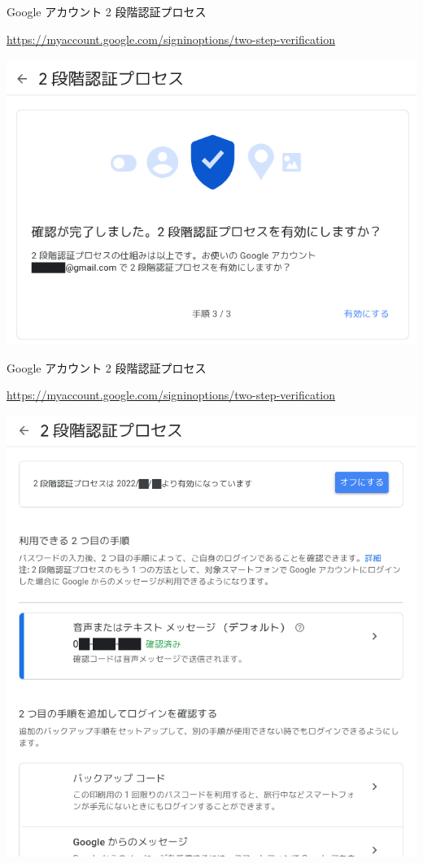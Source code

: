 \begin{frame}{Google アカウント 2 段階認証プロセス}

{\footnotesize\url{https://myaccount.google.com/signinoptions/two-step-verification}}

\begin{center}
\includegraphics[width=0.5\hsize]{image202205/g-signinopt-twostepverif-enroll-3.png}
\end{center}

\begin{quote}
\end{quote}

\end{frame}

\begin{frame}{Google アカウント 2 段階認証プロセス}

{\footnotesize\url{https://myaccount.google.com/signinoptions/two-step-verification}}

\begin{center}
\includegraphics[width=0.5\hsize]{image202205/g-signinopt-twostepverif-0-0.png}
\end{center}

\begin{quote}
\end{quote}

\end{frame}

